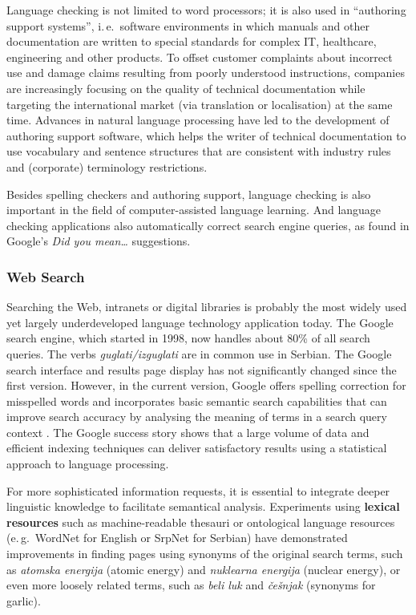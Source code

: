 {\begin{multicols}{2}
Language checking is not limited to word processors; it is also used in “authoring support systems”, i.\,e.~software environments in which manuals and other documentation are written to special standards for complex IT, healthcare, engineering and other products. To offset customer complaints about incorrect use and damage claims resulting from poorly understood instructions, companies are increasingly focusing on the quality of technical documentation while targeting the international market (via translation or localisation) at the same time. Advances in natural language processing have led to the development of authoring support software, which helps the writer of technical documentation to use vocabulary and sentence structures that are consistent with industry rules and (corporate) terminology restrictions. 


Besides spelling checkers and authoring support, language checking is also important in the field of computer-assisted language learning. And language checking applications also automatically correct search engine queries, as found in Google's \textit{Did you mean\ldots}  suggestions. 
 
 \subsubsection {Web Search}

Searching the Web, intranets or digital libraries is probably the most widely used yet largely underdeveloped language technology application today. The Google search engine, which started in 1998, now handles about 80\% of all search queries. \cite{SPIEGEL} The verbs \textit{guglati/izguglati} are in common use in Serbian. The Google search interface and results page display has not significantly changed since the first version. However, in the current version, Google offers spelling correction for misspelled words and incorporates basic semantic search capabilities that can improve search accuracy by analysing the meaning of terms in a search query context \cite{PCWORLD}. The Google success story shows that a large volume of data and efficient indexing techniques can deliver satisfactory results using a statistical approach to language processing.

For more sophisticated information requests, it is essential to integrate deeper linguistic knowledge to facilitate semantical analysis. Experiments using \textbf{lexical resources} such as machine-readable thesauri or ontological language resources (e.\,g.~WordNet for English or SrpNet for Serbian) have demonstrated improvements in finding pages using synonyms of the original search terms, such as \textit{atomska energija} (atomic energy) and \textit{nuklearna energija} (nuclear energy), or even more loosely related terms, such as \textit{beli luk} and \textit{češnjak} (synonyms for garlic).


\end{multicols}}
